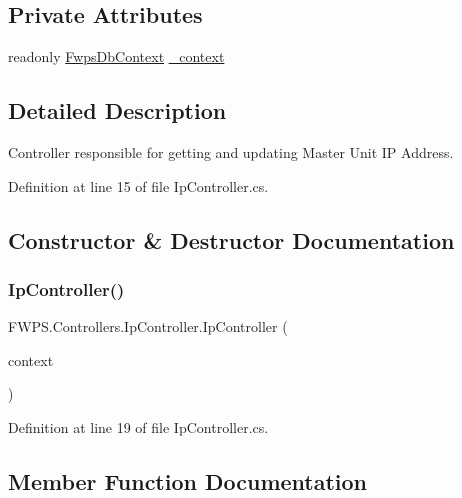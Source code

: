 \subsection*{Private Attributes}
\begin{DoxyCompactItemize}
\item 
readonly \mbox{\hyperlink{class_f_w_p_s_1_1_data_1_1_fwps_db_context}{Fwps\+Db\+Context}} \mbox{\hyperlink{class_f_w_p_s_1_1_controllers_1_1_ip_controller_a6b74e68acf41dc1ca73b68ca4b01c097}{\+\_\+context}}
\end{DoxyCompactItemize}


\subsection{Detailed Description}
Controller responsible for getting and updating Master Unit IP Address. 

Definition at line 15 of file Ip\+Controller.\+cs.



\subsection{Constructor \& Destructor Documentation}
\mbox{\label{class_f_w_p_s_1_1_controllers_1_1_ip_controller_a92f0d0ff639328863f8485ef1f5c8a51}} 
\subsubsection{\texorpdfstring{Ip\+Controller()}{IpController()}}
{\footnotesize\ttfamily F\+W\+P\+S.\+Controllers.\+Ip\+Controller.\+Ip\+Controller (\begin{DoxyParamCaption}\item[{\mbox{\hyperlink{class_f_w_p_s_1_1_data_1_1_fwps_db_context}{Fwps\+Db\+Context}}}]{context }\end{DoxyParamCaption})}



Definition at line 19 of file Ip\+Controller.\+cs.



\subsection{Member Function Documentation}
\mbox{\label{class_f_w_p_s_1_1_controllers_1_1_ip_controller_a84681f490197522433ce269962e2d5a9}} 
